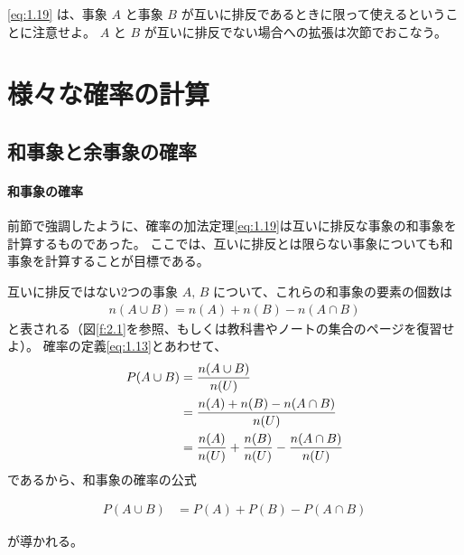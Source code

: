 \documentclass[12pt]{ltjsarticle}\usepackage{ifthen}\newcounter{enlarge}\setcounter{enlarge}{1}
\begin{document}
\eqref{eq:1.19} は、事象 $A$ と事象 $B$ が互いに排反であるときに限って使えるということに注意せよ。
$A$ と $B$ が互いに排反でない場合への拡張は次節でおこなう。


\section{様々な確率の計算}

\subsection{和事象と余事象の確率}

\paragraph{和事象の確率}

前節で強調したように、確率の加法定理\eqref{eq:1.19}は互いに排反な事象の和事象を計算するものであった。
ここでは、互いに排反とは限らない事象についても和事象を計算することが目標である。

互いに排反ではない2つの事象 $A,\, B$ について、これらの和事象の要素の個数は
\begin{align}
  n(A \cup B) = n(A) + n(B) - n(A \cap B) \label{eq:2.1}
\end{align}
と表される（図\ref{f:2.1}を参照、もしくは教科書やノートの集合のページを復習せよ）。
確率の定義\eqref{eq:1.13}とあわせて、
\begin{align}
  P(A \cup B) &= \frac{n(A \cup B)}{n(U)} \notag \\
              &= \frac{n(A) + n(B) - n(A \cap B)}{n(U)} \notag \\
              &= \frac{n(A)}{n(U)} + \frac{n(B)}{n(U)} - \frac{n(A \cap B)}{n(U)}
\end{align}
であるから、和事象の確率の公式
\begin{oframed}
  \begin{align}
    P(A \cup B) &= P(A) + P(B) - P(A \cap B) \label{eq:2.2}
  \end{align}
\end{oframed}
\noindent
が導かれる。
\end{document}
